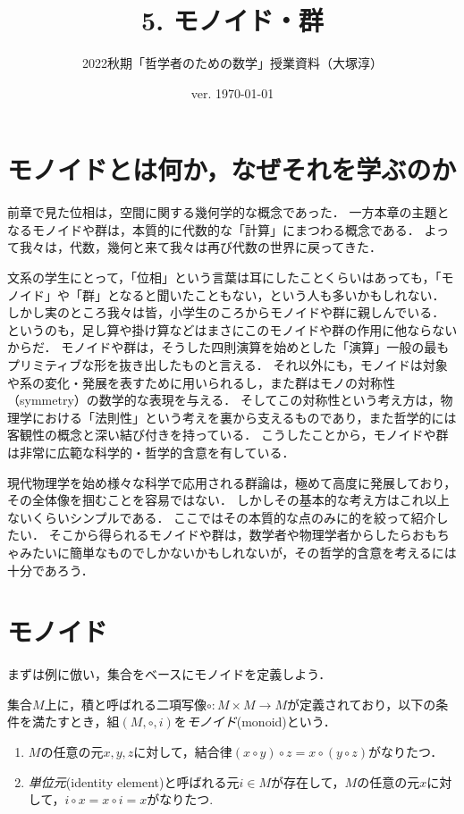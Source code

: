 \documentclass[11pt,a4paper]{jsarticle}
\begin{document}
\title{5. モノイド・群}
\author{2022秋期「哲学者のための数学」授業資料（大塚淳）}
\date{ver. \today}
\maketitle

\section{モノイドとは何か，なぜそれを学ぶのか}
前章で見た位相は，空間に関する幾何学的な概念であった．
一方本章の主題となるモノイドや群は，本質的に代数的な「計算」にまつわる概念である．
よって我々は，代数，幾何と来て我々は再び代数の世界に戻ってきた．

文系の学生にとって，「位相」という言葉は耳にしたことくらいはあっても，「モノイド」や「群」となると聞いたこともない，という人も多いかもしれない．
しかし実のところ我々は皆，小学生のころからモノイドや群に親しんでいる．
というのも，足し算や掛け算などはまさにこのモノイドや群の作用に他ならないからだ．
モノイドや群は，そうした四則演算を始めとした「演算」一般の最もプリミティブな形を抜き出したものと言える．
それ以外にも，モノイドは対象や系の変化・発展を表すために用いられるし，また群はモノの対称性（symmetry）の数学的な表現を与える．
そしてこの対称性という考え方は，物理学における「法則性」という考えを裏から支えるものであり，また哲学的には客観性の概念と深い結び付きを持っている．
こうしたことから，モノイドや群は非常に広範な科学的・哲学的含意を有している．

現代物理学を始め様々な科学で応用される群論は，極めて高度に発展しており，その全体像を掴むことを容易ではない．
しかしその基本的な考え方はこれ以上ないくらいシンプルである．
ここではその本質的な点のみに的を絞って紹介したい．
そこから得られるモノイドや群は，数学者や物理学者からしたらおもちゃみたいに簡単なものでしかないかもしれないが，その哲学的含意を考えるには十分であろう．

\section{モノイド}
まずは例に倣い，集合をベースにモノイドを定義しよう．

\begin{dfn}[モノイド]
集合$M$上に，積と呼ばれる二項写像$\circ: M \times M \to M$が定義されており，以下の条件を満たすとき，組$(M, \circ, i)$を\emph{モノイド}(monoid)という．
\begin{enumerate}
 \item $M$の任意の元$x, y, z$に対して，結合律$(x \circ y) \circ z = x \circ (y \circ z)$がなりたつ．
 \item \emph{単位元}(identity element)と呼ばれる元$i \in M$が存在して，$M$の任意の元$x$に対して，$i \circ x = x \circ i = x$がなりたつ.
\end{enumerate} 
\end{dfn}
\end{document}
